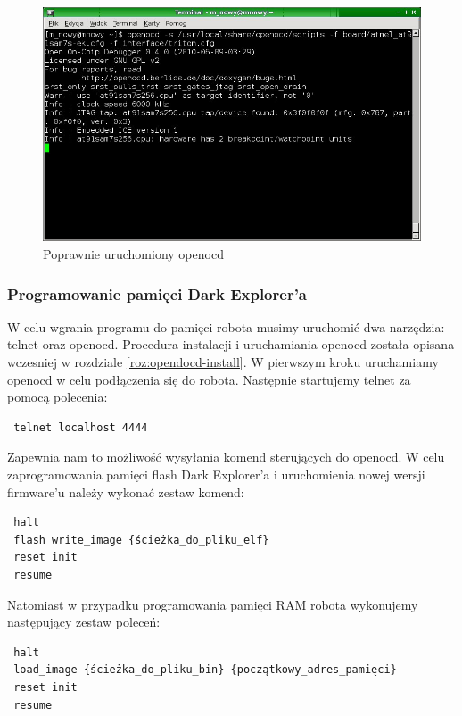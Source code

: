 \begin{figure}
 \centering
 \includegraphics[width=150.0mm]{../images/openocd.jpg}
 \caption{Poprawnie uruchomiony openocd}
 \label{fig:openocd}
\end{figure}

\subsubsection{Programowanie pamięci Dark Explorer'a}
W celu wgrania programu do pamięci robota musimy uruchomić dwa narzędzia: telnet oraz openocd. Procedura instalacji i uruchamiania openocd została opisana wczesniej w rozdziale \ref{roz:opendocd-install}. W pierwszym kroku uruchamiamy openocd w celu podłączenia się do robota. Następnie startujemy telnet za pomocą polecenia:

\begin{verbatim}
 telnet localhost 4444
\end{verbatim}

Zapewnia nam to możliwość wysyłania komend sterujących do openocd. W celu zaprogramowania pamięci flash Dark Explorer'a i uruchomienia nowej wersji firmware'u należy wykonać zestaw komend:

\begin{verbatim}
 halt
 flash write_image {ścieżka_do_pliku_elf}
 reset init
 resume
\end{verbatim}

Natomiast w przypadku programowania pamięci RAM robota wykonujemy następujący zestaw poleceń:

\begin{verbatim}
 halt
 load_image {ścieżka_do_pliku_bin} {początkowy_adres_pamięci}
 reset init
 resume
\end{verbatim}